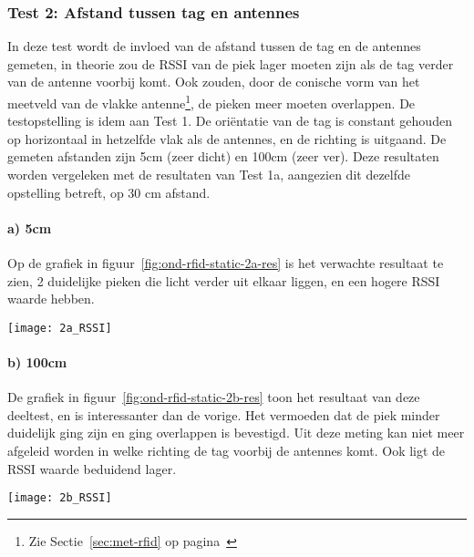 \subsubsection{Test 2: Afstand tussen tag en antennes}
\label{sec:ond-rfid-2-2}
In deze test wordt de invloed van de afstand tussen de tag en de antennes gemeten, in theorie zou de RSSI van de piek lager moeten zijn als de tag verder van de antenne voorbij komt. Ook zouden, door de conische vorm van het meetveld van de vlakke antenne\footnote{Zie Sectie~\ref{sec:met-rfid} op pagina~\pageref{sec:met-rfid}}, de pieken meer moeten overlappen. De testopstelling is idem aan Test 1. De oriëntatie van de tag is constant gehouden op horizontaal in hetzelfde vlak als de antennes, en de richting is uitgaand. De gemeten afstanden zijn 5cm (zeer dicht) en 100cm (zeer ver). Deze resultaten worden vergeleken met de resultaten van Test 1a, aangezien dit dezelfde opstelling betreft, op 30 cm afstand.

\paragraph{a) 5cm}
\begin{minipage}{0.55\textwidth}
Op de grafiek in figuur~\ref{fig:ond-rfid-static-2a-res} is het verwachte resultaat te zien, 2 duidelijke pieken die licht verder uit elkaar liggen, en een hogere RSSI waarde hebben.
\end{minipage}
\hfill
\begin{minipage}{0.42\textwidth}
	\texttt{[image: 2a\_RSSI]}
	\label{fig:ond-rfid-static-2a-res}
\end{minipage}

\paragraph{b) 100cm}
\begin{minipage}{0.55\textwidth}
De grafiek in figuur~\ref{fig:ond-rfid-static-2b-res} toon het resultaat van deze deeltest, en is interessanter dan de vorige. Het vermoeden dat de piek minder duidelijk ging zijn en ging overlappen is bevestigd. Uit deze meting kan niet meer afgeleid worden in welke richting de tag voorbij de antennes komt. Ook ligt de RSSI waarde beduidend lager.
\end{minipage}
\hfill
\begin{minipage}{0.42\textwidth}
	\texttt{[image: 2b\_RSSI]}
	\label{fig:ond-rfid-static-2b-res}
\end{minipage}

